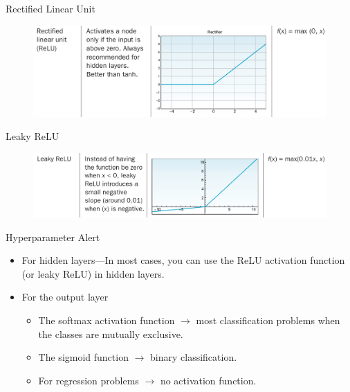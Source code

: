 \documentclass{beamer}
\begin{document}
\begin{frame}{Rectified Linear Unit}
	\begin{figure}[ht]
		\centering
		\includegraphics[scale=0.2]{images/relu-function}
	\end{figure}							
\end{frame}

\begin{frame}{Leaky ReLU}
	\begin{figure}[ht]
		\centering
		\includegraphics[scale=0.2]{images/leaky-function}
	\end{figure}							
\end{frame}

\begin{frame}{Hyperparameter Alert}
	\begin{itemize}
		\item<2-> For hidden layers---In most cases, you can use the ReLU activation function (or leaky ReLU) in hidden layers.
		\item<3-> For the output layer
		\begin{itemize}
			 \item<4-> The softmax activation function $\rightarrow$ most classification problems when the classes are mutually exclusive. 
			 \item<5-> The sigmoid function $\rightarrow$ binary classification. 
			 \item<6-> For regression problems $\rightarrow$ no activation function.
		\end{itemize}	 
	\end{itemize}
\end{frame}
\end{document}
